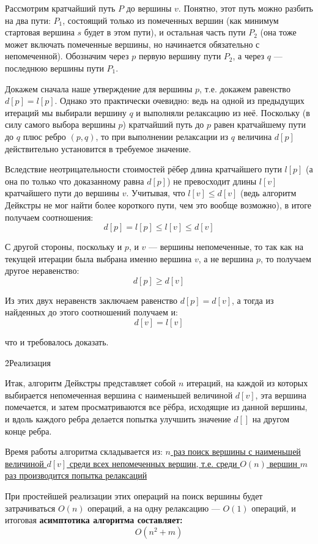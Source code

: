 Рассмотрим кратчайший путь $P$ до вершины $v$. Понятно, этот путь можно разбить на два пути: $P_1$, состоящий только из помеченных вершин (как минимум стартовая вершина $s$ будет в этом пути), и остальная часть пути $P_2$ (она тоже может включать помеченные вершины, но начинается обязательно с непомеченной). Обозначим через $p$ первую вершину пути $P_2$, а через $q$ --- последнюю вершины пути $P_1$.

Докажем сначала наше утверждение для вершины $p$, т.е. докажем равенство $d[p] = l[p]$. Однако это практически очевидно: ведь на одной из предыдущих итераций мы выбирали вершину $q$ и выполняли релаксацию из неё. Поскольку (в силу самого выбора вершины $p$) кратчайший путь до $p$ равен кратчайшему пути до $q$ плюс ребро $(p,q)$, то при выполнении релаксации из $q$ величина $d[p]$ действительно установится в требуемое значение.

Вследствие неотрицательности стоимостей рёбер длина кратчайшего пути $l[p]$ (а она по только что доказанному равна $d[p]$) не превосходит длины $l[v]$ кратчайшего пути до вершины $v$. Учитывая, что $l[v] \le d[v]$ (ведь алгоритм Дейкстры не мог найти более короткого пути, чем это вообще возможно), в итоге получаем соотношения:
$$ d[p] = l[p] \le l[v] \le d[v] $$

С другой стороны, поскольку и $p$, и $v$ --- вершины непомеченные, то так как на текущей итерации была выбрана именно вершина $v$, а не вершина $p$, то получаем другое неравенство:
$$ d[p] \ge d[v] $$

Из этих двух неравенств заключаем равенство $d[p] = d[v]$, а тогда из найденных до этого соотношений получаем и:
$$ d[v] = l[v] $$

что и требовалось доказать.

\h2{Реализация}

Итак, алгоритм Дейкстры представляет собой $n$ итераций, на каждой из которых выбирается непомеченная вершина с наименьшей величиной $d[v]$, эта вершина помечается, и затем просматриваются все рёбра, исходящие из данной вершины, и вдоль каждого ребра делается попытка улучшить значение $d[]$ на другом конце ребра.

Время работы алгоритма складывается из:
\ul{
\li $n$ раз поиск вершины с наименьшей величиной $d[v]$ среди всех непомеченных вершин, т.е. среди $O(n)$ вершин
\li $m$ раз производится попытка релаксаций
}

При простейшей реализации этих операций на поиск вершины будет затрачиваться $O(n)$ операций, а на одну релаксацию --- $O(1)$ операций, и итоговая \bf{асимптотика} алгоритма составляет:
$$ O(n^2+m) $$

